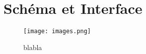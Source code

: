 \section{Schéma et Interface}

\begin{figure}
\centerline{\texttt{[image: images.png]}}
\caption{blabla}
\end{figure}



